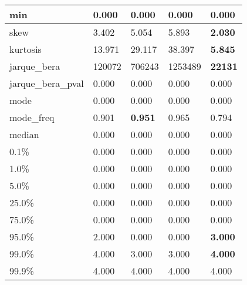 \begin{table}[H]
\begin{tabular}{|l|m{10em}|m{10em}|m{10em}|m{10em}|}
\hline min & 0.000 & 0.000 & 0.000 & 0.000 \\
\hline skew & 3.402 & 5.054 & \cellcolor[rgb]{0.9, 0.54, 0.52} 5.893 & \bfseries 2.030 \\
\hline kurtosis & 13.971 & 29.117 & \cellcolor[rgb]{0.9, 0.54, 0.52} 38.397 & \bfseries 5.845 \\
\hline jarque\_bera & 120072 & 706243 & \cellcolor[rgb]{0.9, 0.54, 0.52} 1253489 & \bfseries 22131 \\
\hline jarque\_bera\_pval & 0.000 & 0.000 & 0.000 & 0.000 \\
\hline mode & 0.000 & 0.000 & 0.000 & 0.000 \\
\hline mode\_freq & 0.901 & \bfseries 0.951 & 0.965 & \cellcolor[rgb]{0.9, 0.54, 0.52} 0.794 \\
\hline median & 0.000 & 0.000 & 0.000 & 0.000 \\
\hline 0.1\% & 0.000 & 0.000 & 0.000 & 0.000 \\
\hline 1.0\% & 0.000 & 0.000 & 0.000 & 0.000 \\
\hline 5.0\% & 0.000 & 0.000 & 0.000 & 0.000 \\
\hline 25.0\% & 0.000 & 0.000 & 0.000 & 0.000 \\
\hline 75.0\% & 0.000 & 0.000 & 0.000 & 0.000 \\
\hline 95.0\% & 2.000 & \cellcolor[rgb]{0.9, 0.54, 0.52} 0.000 & \cellcolor[rgb]{0.9, 0.54, 0.52} 0.000 & \bfseries 3.000 \\
\hline 99.0\% & 4.000 & \cellcolor[rgb]{0.9, 0.54, 0.52} 3.000 & \cellcolor[rgb]{0.9, 0.54, 0.52} 3.000 & \bfseries 4.000 \\
\hline 99.9\% & 4.000 & 4.000 & 4.000 & 4.000 \\
\hline
\end{tabular}
\end{table}
